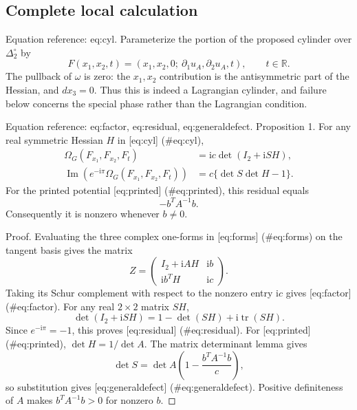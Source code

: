 \documentclass[10pt]{article}
\begin{document}
\subsection*{Complete local calculation}
Equation reference: eq:cyl. Parameterize the portion of the proposed cylinder over \(\Delta_2^\circ\) by \[
 F(x_1,x_2,t)=
 (x_1,x_2,0;\ \partial_1u_A,\partial_2u_A,t),\qquad t\in\mathbb R.\] The pullback of \(\omega\) is zero: the \(x_1,x_2\) contribution is the antisymmetric part of the Hessian, and \(dx_3=0\). Thus this is indeed a Lagrangian cylinder, and failure below concerns the special phase rather than the Lagrangian condition.\par
Equation reference: eq:factor, eq:residual, eq:generaldefect. Proposition 1.  For any real symmetric Hessian \(H\) in [eq:cyl] (\#eq:cyl), \[\begin{aligned}
 \Omega_G(F_{x_1},F_{x_2},F_t)
 &=\mathrm ic\det(I_2+\mathrm iSH),\\
 \operatorname{Im}\!\left(e^{-\mathrm i\pi}
 \Omega_G(F_{x_1},F_{x_2},F_t)\right)
 &=c\{\det S\det H-1\}.\end{aligned}\] For the printed potential [eq:printed] (\#eq:printed), this residual equals \[
 -b^{T}A^{-1}b.\] Consequently it is nonzero whenever \(b\ne0\).\par
Proof. Evaluating the three complex one-forms in [eq:forms] (\#eq:forms) on the tangent basis gives the matrix \[Z=\begin{pmatrix}I_2+\mathrm iAH&\mathrm ib\\
                  \mathrm ib^{T}H&\mathrm ic\end{pmatrix}.\] Taking its Schur complement with respect to the nonzero entry \(\mathrm ic\) gives [eq:factor] (\#eq:factor). For any real \(2\times2\) matrix \(SH\), \[\det(I_2+\mathrm iSH)=1-\det(SH)+\mathrm i\operatorname{tr}(SH).\] Since \(e^{-\mathrm i\pi}=-1\), this proves [eq:residual] (\#eq:residual). For [eq:printed] (\#eq:printed), \(\det H=1/\det A\). The matrix determinant lemma gives \[\det S=\det A\left(1-\frac{b^{T}A^{-1}b}{c}\right),\] so substitution gives [eq:generaldefect] (\#eq:generaldefect). Positive definiteness of \(A\) makes \(b^{T}A^{-1}b>0\) for nonzero \(b\). ◻\par
\end{document}
